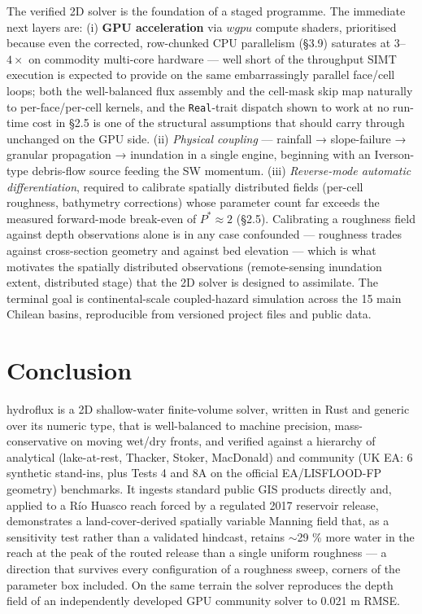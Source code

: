 The verified 2D solver is the foundation of a staged programme. The
immediate next layers are: (i) \textbf{GPU acceleration} via \(wgpu\)
compute shaders, prioritised because even the corrected, row-chunked CPU
parallelism (§3.9) saturates at \(3\)--\(4×\) on commodity multi-core
hardware --- well short of the throughput SIMT execution is expected to
provide on the same embarrassingly parallel face/cell loops; both the
well-balanced flux assembly and the cell-mask skip map naturally to
per-face/per-cell kernels, and the \texttt{Real}-trait dispatch shown to
work at no run-time cost in §2.5 is one of the structural assumptions
that should carry through unchanged on the GPU side. (ii) \emph{Physical
coupling} --- rainfall → slope-failure → granular propagation →
inundation in a single engine, beginning with an Iverson-type
debris-flow source \citep{Iverson2000, Christen2010} feeding the SW
momentum. (iii) \emph{Reverse-mode automatic differentiation}, required
to calibrate spatially distributed fields (per-cell roughness,
bathymetry corrections) whose parameter count far exceeds the measured
forward-mode break-even of \(P^{*} \approx 2\) (§2.5). Calibrating a
roughness field against depth observations alone is in any case
confounded --- roughness trades against cross-section geometry and
against bed elevation --- which is what motivates the spatially
distributed observations (remote-sensing inundation extent, distributed
stage) that the 2D solver is designed to assimilate. The terminal goal
is continental-scale coupled-hazard simulation across the 15 main
Chilean basins, reproducible from versioned project files and public
data.

\section{Conclusion}

hydroflux is a 2D shallow-water finite-volume solver, written in Rust
and generic over its numeric type, that is well-balanced to machine
precision, mass-conservative on moving wet/dry fronts, and verified
against a hierarchy of analytical (lake-at-rest, Thacker, Stoker,
MacDonald) and community (UK EA: 6 synthetic stand-ins, plus Tests 4 and
8A on the official EA/LISFLOOD-FP geometry) benchmarks. It ingests
standard public GIS products directly and, applied to a Río Huasco reach
forced by a regulated 2017 reservoir release, demonstrates a
land-cover-derived spatially variable Manning field that, as a
sensitivity test rather than a validated hindcast, retains
$\sim$29 \% more water in the reach at the peak of the routed
release than a single uniform roughness --- a direction that survives
every configuration of a roughness sweep, corners of the parameter box
included. On the same terrain the solver reproduces the depth field of
an independently developed GPU community solver to 0.021 m RMSE.

